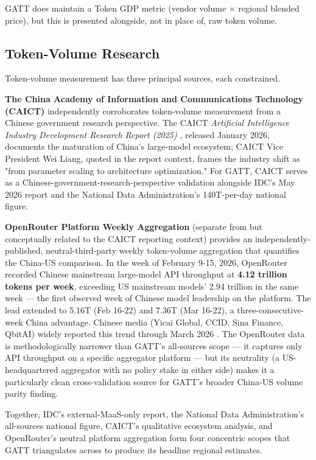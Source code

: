 \documentclass[11pt,a4paper]{article}
\begin{document}
GATT does maintain a Token GDP metric (vendor volume × regional blended price), but this is presented alongside, not in place of, raw token volume.

\subsection{Token-Volume Research}

Token-volume measurement has three principal sources, each constrained.

\textbf{The China Academy of Information and Communications Technology (CAICT)} independently corroborates token-volume measurement from a Chinese government research perspective. The CAICT \emph{Artificial Intelligence Industry Development Research Report (2025)} \cite{caict2026ai}, released January 2026, documents the maturation of China's large-model ecosystem; CAICT Vice President Wei Liang, quoted in the report context, frames the industry shift as "from parameter scaling to architecture optimization." For GATT, CAICT serves as a Chinese-government-research-perspective validation alongside IDC's May 2026 report and the National Data Administration's 140T-per-day national figure.

\textbf{OpenRouter Platform Weekly Aggregation} (separate from but conceptually related to the CAICT reporting context) provides an independently-published, neutral-third-party weekly token-volume aggregation that quantifies the China-US comparison. In the week of February 9-15, 2026, OpenRouter recorded Chinese mainstream large-model API throughput at \textbf{4.12 trillion tokens per week}, exceeding US mainstream models' 2.94 trillion in the same week --- the first observed week of Chinese model leadership on the platform. The lead extended to 5.16T (Feb 16-22) and 7.36T (Mar 16-22), a three-consecutive-week China advantage. Chinese media (Yicai Global, CCID, Sina Finance, QbitAI) widely reported this trend through March 2026 \cite{idc2026china}. The OpenRouter data is methodologically narrower than GATT's all-sources scope --- it captures only API throughput on a specific aggregator platform --- but its neutrality (a US-headquartered aggregator with no policy stake in either side) makes it a particularly clean cross-validation source for GATT's broader China-US volume parity finding.

Together, IDC's external-MaaS-only report, the National Data Administration's all-sources national figure, CAICT's qualitative ecosystem analysis, and OpenRouter's neutral platform aggregation form four concentric scopes that GATT triangulates across to produce its headline regional estimates.
\end{document}
